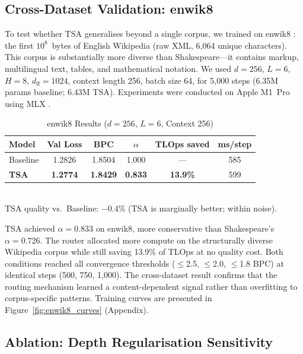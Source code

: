 \documentclass{article}
\newcommand{\tsa}{TSA\xspace}
\newcommand{\tlops}{TLOps\xspace}
\begin{document}
\subsection{Cross-Dataset Validation: enwik8}
\label{sec:enwik8}

To test whether \tsa generalises beyond a single corpus, we trained on
enwik8 \citep{hutter2006prize}: the first $10^8$~bytes of English Wikipedia
(raw XML, 6{,}064 unique characters). This corpus is substantially more diverse
than Shakespeare---it contains markup, multilingual text, tables, and mathematical
notation. We used $d{=}256$, $L{=}6$, $H{=}8$, $d_\mathrm{ff}{=}1024$, context
length 256, batch size 64, for 5{,}000 steps (6.35M params baseline; 6.43M \tsa).
Experiments were conducted on Apple M1~Pro using
MLX \citep{mlx2023}.

\begin{table}[h]
\centering
\caption{enwik8 Results ($d{=}256$, $L{=}6$, Context 256)}
\label{tab:enwik8}
\small
\begin{tabular}{lccccc}
\toprule
Model & Val Loss & BPC & $\alpha$ & TLOps saved & ms/step \\
\midrule
Baseline & 1.2826 & 1.8504 & 1.000 & --- & 585 \\
\textbf{TSA} & \textbf{1.2774} & \textbf{1.8429} & \textbf{0.833} & \textbf{13.9\%} & 599 \\
\bottomrule
\end{tabular}
\\[3pt]
{\footnotesize TSA quality vs.\ Baseline: $-$0.4\% (TSA is marginally better; within noise).}
\end{table}

\tsa achieved $\alpha = 0.833$ on enwik8, more conservative than Shakespeare's
$\alpha = 0.726$. The router allocated more compute on the structurally diverse
Wikipedia corpus while still saving 13.9\% of \tlops at no quality cost.
Both conditions reached all convergence thresholds ($\leq$2.5, $\leq$2.0, $\leq$1.8 BPC)
at identical steps (500, 750, 1{,}000). The cross-dataset result confirms that the
routing mechanism learned a content-dependent signal rather than overfitting to
corpus-specific patterns. Training curves are presented in
Figure~\ref{fig:enwik8_curves} (Appendix).

\subsection{Ablation: Depth Regularisation Sensitivity}
\label{sec:ablation_lambda}
\end{document}
